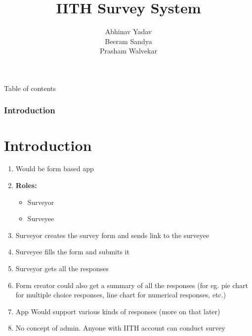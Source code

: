 \documentclass{beamer}
\title{IITH Survey System}
\author{Abhinav Yadav\\
        Beeram Sandya\\
        Prasham Walvekar}
\begin{document}
\maketitle

\begin{frame}{Table of contents}
    \tableofcontents
\end{frame}

\begin{frame}
    \frametitle{Introduction}
    \section{Introduction}
    \begin{enumerate}
        \item Would be form based app
        \item \textbf{Roles:}
              \begin{itemize}
                  \item Surveyor
                  \item Surveyee
              \end{itemize}
        \item Surveyor creates the survey form and sends link to the surveyee
        \item Surveyee fills the form and submits it
        \item Surveyor gets all the responses
        \item Form creator could also get a summary of all the responses (for eg. pie chart for multiple choice responses, line chart for numerical responses, etc.)
        \item App Would support various kinds of responses (more on that later)
        \item No concept of admin. Anyone with IITH account can conduct survey
    \end{enumerate}
\end{frame}
\end{document}
